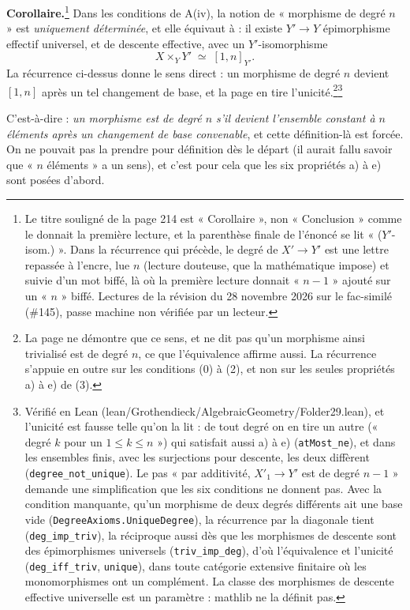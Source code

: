 \documentclass[11pt,a4paper]{article}
\begin{document}
\textbf{Corollaire.}\footnote{Le titre souligné de la page 214 est
« Corollaire », non « Conclusion » comme le donnait la première lecture, et
la parenthèse finale de l'énoncé se lit « ($Y'$-isom.) ». Dans la récurrence
qui précède, le degré de $X' \to Y'$ est une lettre repassée à l'encre, lue
$n$ (lecture douteuse, que la mathématique impose) et suivie d'un mot biffé,
là où la première lecture donnait « $n - 1$ » ajouté sur un « $n$ » biffé.
Lectures de la révision du 28 novembre 2026 sur le fac-similé (\#145),
passe machine non vérifiée par un lecteur.} Dans les conditions de A(iv), la
notion de « morphisme de
degré $n$ » est \emph{uniquement déterminée}, et elle équivaut à : il existe
$Y' \to Y$ épimorphisme effectif universel, et de descente effective, avec
un $Y'$-isomorphisme
\[
  X \times_{Y} Y' \;\simeq\; [1, n]_{Y'} .
\]
La récurrence ci-dessus donne le sens direct : un morphisme de degré $n$
devient $[1, n]$ après un tel changement de base, et la page en tire
l'unicité.\footnote{La page ne démontre que ce sens, et ne dit pas qu'un
morphisme ainsi trivialisé est de degré $n$, ce que l'équivalence affirme
aussi. La récurrence s'appuie en outre sur les conditions (0) à (2), et non
sur les seules propriétés a) à e) de (3).}\footnote{Vérifié en Lean
(lean/Grothendieck/AlgebraicGeometry/Folder29.lean), et l'unicité est fausse telle qu'on la
lit : de tout degré on en tire un autre (« degré $k$ pour un
$1 \leqslant k \leqslant n$ ») qui satisfait aussi a) à e)
(\texttt{atMost\_ne}), et dans les ensembles finis, avec les surjections pour
descente, les deux diffèrent (\texttt{degree\_not\_unique}). Le pas « par
additivité, $X'_1 \to Y'$ est de degré $n - 1$ » demande une simplification
que les six conditions ne donnent pas. Avec la condition manquante, qu'un
morphisme de deux degrés différents ait une base vide
(\texttt{DegreeAxioms.UniqueDegree}), la récurrence par la diagonale tient
(\texttt{deg\_imp\_triv}), la réciproque aussi dès que les morphismes de
descente sont des épimorphismes universels (\texttt{triv\_imp\_deg}), d'où
l'équivalence et l'unicité (\texttt{deg\_iff\_triv}, \texttt{unique}), dans
toute catégorie extensive finitaire où les monomorphismes ont un complément. La
classe des morphismes de descente effective universelle est un paramètre : mathlib
ne la définit pas.}

C'est-à-dire : \emph{un morphisme est de degré $n$ s'il devient l'ensemble
constant à $n$ éléments après un changement de base convenable}, et cette
définition-là est forcée. On ne pouvait pas la prendre pour définition dès le
départ (il aurait fallu savoir que « $n$ éléments » a un sens), et c'est
pour cela que les six propriétés a) à e) sont posées d'abord.
\end{document}
